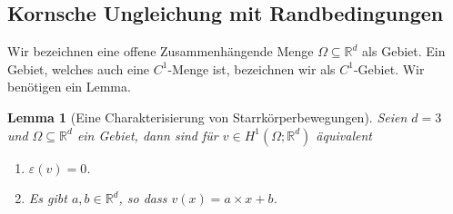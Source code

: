\documentclass{scrartcl}
\newcounter{everything}
\newtheorem{lemma}[everything]{Lemma}
\def\R{\mathbb{R}}
\def\e{\varepsilon}
\begin{document}
\subsection{Kornsche Ungleichung mit Randbedingungen}

Wir bezeichnen eine offene Zusammenhängende Menge $\Omega\subseteq\R^d$ als Gebiet. Ein Gebiet, welches auch eine $C^1$-Menge ist, bezeichnen wir als $C^1$-Gebiet. Wir benötigen ein Lemma.
\begin{lemma}[Eine Charakterisierung von Starrkörperbewegungen]\label{le:CharakterisierungStarrkoerper}
	Seien $d=3$ und $\Omega\subseteq\R^d$ ein Gebiet, dann sind für $v\in H^1(\Omega;\R^d)$ äquivalent
	\begin{enumerate}
		\item \label{ersteCharakterisierungStarrkoerper} $\e(v) = 0$.
		\item Es gibt $a,b\in\R^d$, so dass $v(x)=a\times x+b$.\label{zweiteCharakterisierungStarrkoerper}
	\end{enumerate}
\end{lemma}
\end{document}
